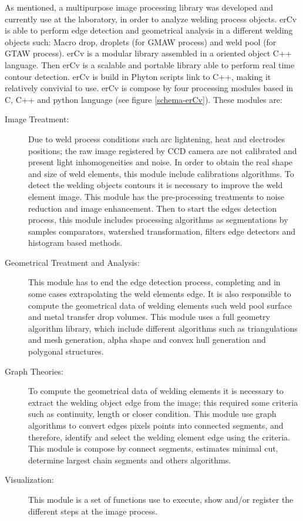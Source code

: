 \begin{Segmentation}
As mentioned, a multipurpose image processing library was developed and currently use at the laboratory, in order to analyze welding process objects.
erCv is able to perform edge detection and geometrical analysis in a different welding objects such: Macro drop, droplets (for GMAW process) and weld pool (for GTAW process).
erCv is a modular library assembled in a oriented object C++ language. Then erCv is a scalable and portable library able to perform real time contour detection. erCv is build in Phyton scripts link to C++, making it relatively convivial to use.
erCv is compose by four processing modules based in C,  C++ and python language (see figure \ref{schema-erCv}). These modules are: 
\begin{description}
\item[Image Treatment:] Due to weld process conditions such arc lightening, heat and electrodes positions; the raw image registered by CCD camera are not calibrated and present light inhomogeneities and noise. In order to obtain the real shape and size of weld elements, this module include calibrations algorithms. To detect the welding objects contours it is necessary to improve the weld element image. This module has the pre-processing treatments to noise reduction and image enhancement. Then to start the edges detection process, this module includes processing algorithms as segmentations by samples comparators, watershed transformation, filters edge detectors and histogram based methods.  
\item[Geometrical Treatment and Analysis:] This module has to end the edge detection process, completing and in some cases extrapolating the weld elements edge. It is also responsible to compute the geometrical data of welding elements such weld pool surface and metal transfer drop volumes. This module uses a full geometry algorithm library, which include different algorithms such as triangulations and mesh generation, alpha shape and convex hull generation and polygonal structures.
\item[Graph Theories:] To compute the geometrical data of welding elements it is necessary to extract the welding object edge from the image; this required some criteria such as continuity, length or closer condition.  This module use graph algorithms to convert edges pixels points into connected segments, and therefore, identify and select the welding element edge using the criteria. This module is compose by connect segments, estimates minimal cut, determine largest chain segments and others algorithms. 
\item[Visualization:] This module is a set of functions use to execute, show and/or register the different steps at the image process.
\end{description}


\end{Segmentation}
